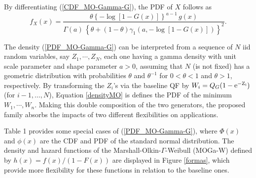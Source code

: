 \documentclass[twoside,leqno,11pt]{article}
\begin{document}
By differentiating (\ref{CDF_MO-Gamma-G}), the PDF of $X$ follows as
\begin{equation}\label{PDF_MO-Gamma-G}
f_{X}(x)=\frac{\theta  \left\{ -\log[1-G(x)] \right\}^{a-1}\, g(x)}{\Gamma(a)\,\left\{\theta+(1-\theta)\gamma_1\left( a, -\log \left[1-G(x)\right]\right)\right\}^{2}}.
\end{equation}

The density (\ref{PDF_MO-Gamma-G}) can be interpreted from a sequence of $N$ iid random variables, say $Z_1,\cdots,Z_N$,
each one having a gamma density with unit scale parameter and shape parameter $a>0$, assuming that $N$ (is not fixed) has a geometric 
distribution with probabilities $\theta$ and $\theta^{-1}$ for $0<\theta<1$ and $\theta>1$,
respectively. By transforming the $Z_i$'s via the baseline QF by $W_i=Q_G(1-\rm{e}^{-Z_i})$
(for $i-1,\ldots,N$), Equation \eqref{densityMO} is defines the PDF of the minimum $W_1,\cdots,W_n$. 
Making this double composition of the two generators, the proposed family absorbs the impacts of two different flexibilities 
on applications. 


Table 1 provides some special cases of (\ref{PDF_MO-Gamma-G}), where
$\Phi(x)$ and $\phi(x)$ are the CDF and PDF of the standard normal distribution. The density and hazard functions
of the Marshall-Olkin-$\Gamma$-Weibull (MOGa-W) defined by $h(x) = f(x)/(1-F(x))$ are displayed in Figure \ref{formas}, which provide
more flexibility for these functions in relation to the baseline ones.

\vspace{0.6cm}

\end{document}
